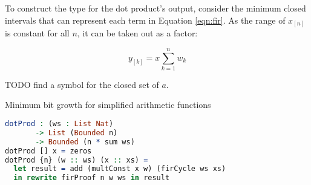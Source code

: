 \documentclass[conference]{IEEEtran}
\begin{document}
To construct the type for the dot product's output, consider the minimum closed
intervals that can represent each term in Equation \ref{eqn:fir}. As the range of $x_[n]$ is constant for all $n$, it can be taken out as a factor: 

\begin{equation}
  y_{[k]} = x\sum_{k=1}^{n} w_k
\label{eqn:fir}
\end{equation}

TODO find a symbol for the closed set of $a$.


\begin{codefig}[h]
  \caption{Minimum bit growth for simplified arithmetic functions}
\begin{lstlisting}[language=idris]
dotProd : (ws : List Nat)
       -> List (Bounded n)
       -> Bounded (n * sum ws)
dotProd [] x = zeros
dotProd {n} (w :: ws) (x :: xs) =
  let result = add (multConst x w) (firCycle ws xs)
  in rewrite firProof n w ws in result
\end{lstlisting}
\label{lst:dot_prod}
\end{codefig}


\end{document}
